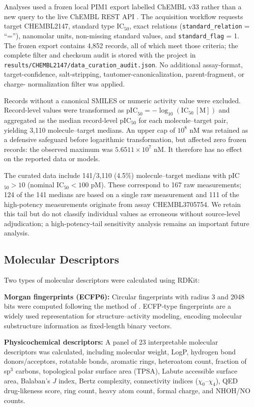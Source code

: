 \documentclass[11pt]{article}
\begin{document}
Analyses used a frozen local PIM1 export labelled ChEMBL v33 rather than a new query to
the live ChEMBL REST API \citep{zdrazil2024chembl}. The acquisition workflow requests
target CHEMBL2147, standard type IC$_{50}$, exact relations
(\texttt{standard\_relation} = ``=''), nanomolar units, non-missing standard values, and
\texttt{standard\_flag} = 1. The frozen export contains 4,852 records, all of which meet
those criteria; the complete filter and checksum audit is stored with the project in
\texttt{results/CHEMBL2147/data\_curation\_audit.json}. No additional assay-format,
target-confidence, salt-stripping, tautomer-canonicalization, parent-fragment, or charge-
normalization filter was applied.

Records without a canonical SMILES or numeric activity value were excluded. Record-level
values were transformed as
$\mathrm{pIC}_{50}=-\log_{10}(\mathrm{IC}_{50}\,[\mathrm{M}])$ and aggregated as the
median record-level pIC$_{50}$ for each molecule--target pair, yielding 3,110
molecule--target medians. An upper cap of $10^8$ nM was retained as a defensive safeguard
before logarithmic transformation, but affected zero frozen records: the observed maximum
was $5.6511\times10^7$ nM. It therefore has no effect on the reported data or models.

The curated data include 141/3,110 (4.5\%) molecule--target medians with
pIC$_{50}>10$ (nominal IC$_{50}<100$ pM). These correspond to 167 raw measurements;
124 of the 141 medians are based on a single raw measurement and 111 of the high-potency
measurements originate from assay CHEMBL3705754. We retain this tail but do not classify
individual values as erroneous without source-level adjudication; a high-potency-tail
sensitivity analysis remains an important future analysis.

\subsection{Molecular Descriptors}

Two types of molecular descriptors were calculated using RDKit:

\textbf{Morgan fingerprints (ECFP6):} Circular fingerprints with radius 3 and 2048 bits
were computed following the method of \citet{rogers2010extended}.
ECFP-type fingerprints are a widely used representation for structure--activity modeling,
encoding molecular substructure information as fixed-length binary vectors.

\textbf{Physicochemical descriptors:} A panel of 23 interpretable molecular descriptors
was calculated, including molecular weight, LogP, hydrogen bond donors/acceptors,
rotatable bonds, aromatic rings, heteroatom count, fraction of sp$^3$ carbons, topological
polar surface area (TPSA), Labute accessible surface area, Balaban's $J$ index, Bertz
complexity, connectivity indices ($\chi_0$--$\chi_4$), QED drug-likeness score, ring count,
heavy atom count, formal charge, and NHOH/NO counts.
\end{document}

